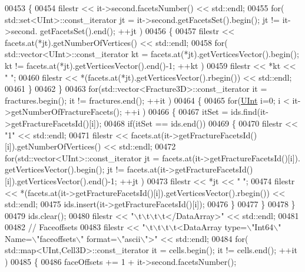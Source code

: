 \begin{DoxyCode}
00453     \{
00454         filestr << it->second.facetsNumber() << std::endl;
00455         \textcolor{keywordflow}{for}( std::set<UInt>::const\_iterator jt = it->second.getFacetsSet().begin(); jt != it->second.
      getFacetsSet().end(); ++jt )
00456         \{
00457             filestr << facets.at(*jt).getNumberOfVertices() << std::endl;
00458             \textcolor{keywordflow}{for}( std::vector<UInt>::const\_iterator kt = facets.at(*jt).getVerticesVector().begin(); kt != 
      facets.at(*jt).getVerticesVector().end()-1; ++kt )
00459                 filestr << *kt << \textcolor{stringliteral}{" "};
00460             filestr << *(facets.at(*jt).getVerticesVector().rbegin()) << std::endl;
00461         \}
00462     \}
00463     \textcolor{keywordflow}{for}(std::vector<Fracture3D>::const\_iterator it = fractures.begin(); it != fractures.end(); ++it )
00464     \{
00465         \textcolor{keywordflow}{for}(\hyperlink{namespaceFVCode3D_a4bf7e328c75d0fd504050d040ebe9eda}{UInt} i=0; i < it->getNumberOfFractureFacets(); ++i )
00466         \{
00467             itSet = ids.find(it->getFractureFacetsId()[i]);
00468             \textcolor{keywordflow}{if}(itSet == ids.end())
00469             \{
00470                 filestr << \textcolor{stringliteral}{"1"} << std::endl;
00471                 filestr << facets.at(it->getFractureFacetsId()[i]).getNumberOfVertices() << std::endl;
00472                 \textcolor{keywordflow}{for}(std::vector<UInt>::const\_iterator jt = facets.at(it->getFractureFacetsId()[i]).
      getVerticesVector().begin(); jt != facets.at(it->getFractureFacetsId()[i]).getVerticesVector().end()-1; ++jt )
00473                     filestr << *jt << \textcolor{stringliteral}{" "};
00474                 filestr << *(facets.at(it->getFractureFacetsId()[i]).getVerticesVector().rbegin()) << 
      std::endl;
00475                 ids.insert(it->getFractureFacetsId()[i]);
00476             \}
00477         \}
00478     \}
00479     ids.clear();
00480     filestr << \textcolor{stringliteral}{"\(\backslash\)t\(\backslash\)t\(\backslash\)t\(\backslash\)t</DataArray>"} << std::endl;
00481 
00482     \textcolor{comment}{//  Faceoffsets}
00483     filestr << \textcolor{stringliteral}{"\(\backslash\)t\(\backslash\)t\(\backslash\)t\(\backslash\)t<DataArray type=\(\backslash\)"Int64\(\backslash\)" Name=\(\backslash\)"faceoffsets\(\backslash\)" format=\(\backslash\)"ascii\(\backslash\)">"} << std::endl;
00484     \textcolor{keywordflow}{for}( std::map<UInt,Cell3D>::const\_iterator it = cells.begin(); it != cells.end(); ++it )
00485     \{
00486         faceOffsets += 1 + it->second.facetsNumber();

\end{DoxyCode}
